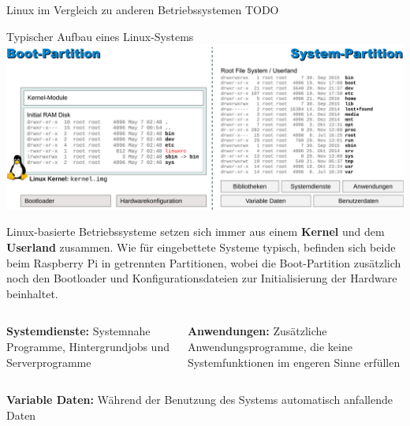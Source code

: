 \begin{frame}{Linux im Vergleich zu anderen Betriebssystemen}
    TODO
\end{frame}

{
\footnotesize

\begin{frame}[allowframebreaks]{Typischer Aufbau eines Linux-Systems}
    \includegraphics[width=\textwidth]{8-linux/img/linux-aufbau}
    \smallskip

    \parbox{\linewidth}{
        Linux-basierte Betriebssysteme setzen sich immer aus einem \textbf{Kernel}
        und dem \textbf{Userland} zusammen. Wie für eingebettete Systeme typisch,
        befinden sich beide beim Raspberry Pi in getrennten Partitionen, wobei die
        Boot-Partition zusätzlich noch den Bootloader und Konfigurationsdateien zur
        Initialisierung der Hardware beinhaltet.
    }

    {
        \bigskip
        \scriptsize

        \begin{columns}[T, onlytextwidth]
            \parbox{\linewidth}{
                \textbf{Systemdienste:} Systemnahe Programme, Hintergrundjobs und
                Serverprogramme
            }

            \parbox{\linewidth}{
                \textbf{Anwendungen:} Zusätzliche Anwendungsprogramme, die keine
                Systemfunktionen im engeren Sinne erfüllen
            }
        \end{columns}

        \medskip

        \begin{columns}[T, onlytextwidth]
            \parbox{\linewidth}{
                \textbf{Variable Daten:} Während der Benutzung des Systems automatisch
                anfallende Daten
            }


\end{columns}}
\end{frame}}
